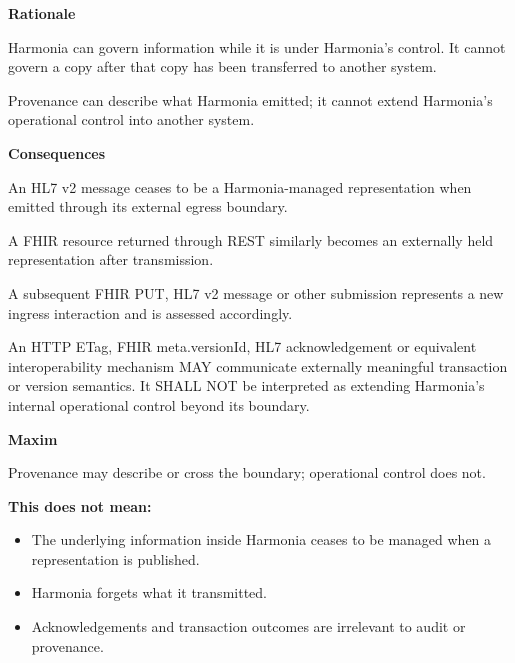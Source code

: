 \par\medskip\textbf{Rationale}\par


Harmonia can govern information while it is under Harmonia's control. It
cannot govern a copy after that copy has been transferred to another
system.



Provenance can describe what Harmonia emitted; it cannot extend
Harmonia's operational control into another system.



\par\medskip\textbf{Consequences}\par


An HL7 v2 message ceases to be a Harmonia-managed representation when
emitted through its external egress boundary.



A FHIR resource returned through REST similarly becomes an externally
held representation after transmission.



A subsequent FHIR PUT, HL7 v2 message or other submission represents a
new ingress interaction and is assessed accordingly.



An HTTP ETag, FHIR meta.versionId, HL7 acknowledgement or equivalent
interoperability mechanism MAY communicate externally meaningful
transaction or version semantics. It SHALL NOT be interpreted as
extending Harmonia's internal operational control beyond its boundary.



\par\medskip\textbf{Maxim}\par


Provenance may describe or cross the boundary; operational control does
not.



\textbf{This does not mean:}



\begin{itemize}


\item The underlying information inside Harmonia ceases to be managed when a representation is published.

\item Harmonia forgets what it transmitted.

\item Acknowledgements and transaction outcomes are irrelevant to audit or provenance.

\end{itemize}

